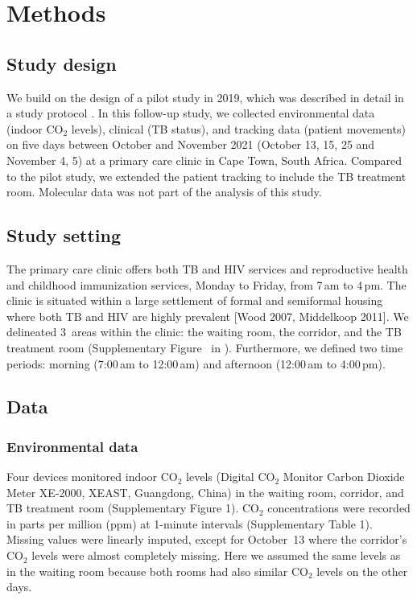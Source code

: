 \documentclass[fleqn,11pt]{wlscirep}
\begin{document}
\newpage

\section{Methods}

\subsection{Study design}

We build on the design of a pilot study in 2019\cite{Zurcher2022JID}, which was described in detail in a study protocol \cite{Zurcher2020BMJ}. In this follow-up study, we collected environmental data (indoor CO$_2$ levels), clinical (TB status), and tracking data (patient movements) on five days between October and November 2021 (October 13, 15, 25 and November 4, 5) at a primary care clinic in Cape Town, South Africa. Compared to the pilot study, we extended the patient tracking to include the TB treatment room. Molecular data was not part of the analysis of this study. 

\subsection{Study setting}

The primary care clinic offers both TB and HIV services and reproductive health and childhood immunization services, Monday to Friday, from 7\,am to 4\,pm. The clinic is situated within a large settlement of formal and semiformal housing where both TB and HIV are highly prevalent\cite{Wood2007AMJRCCD,Middelkoop2011JAIDS} [Wood 2007, Middelkoop 2011]. We delineated 3~areas within the clinic: the waiting room, the corridor, and the TB treatment room (Supplementary Figure~ in \supp). Furthermore, we defined two time periods: morning (7:00\,am to 12:00\,am) and afternoon (12:00\,am to 4:00\,pm). 

\subsection{Data}

\subsubsection{Environmental data}

Four devices monitored indoor CO$_2$ levels (Digital CO$_2$ Monitor Carbon Dioxide Meter XE-2000, XEAST, Guangdong, China) in the waiting room, corridor, and TB treatment room (Supplementary Figure 1). CO$_2$ concentrations were recorded in parts per million (ppm) at 1-minute intervals (Supplementary Table 1). Missing values were linearly imputed, except for October~13 where the corridor's CO$_2$ levels were almost completely missing. Here we assumed the same levels as in the waiting room because both rooms had also similar CO$_2$ levels on the other days.    
\end{document}
